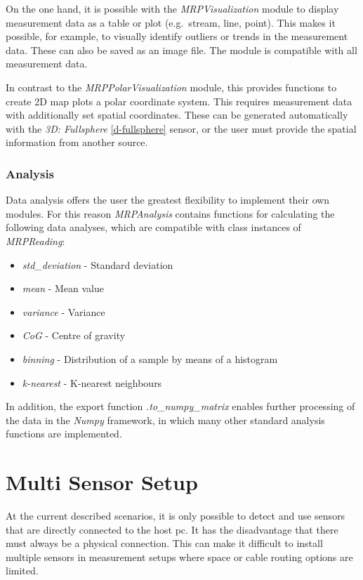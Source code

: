 On the one hand, it is possible with the \emph{MRPVisualization} module
to display measurement data as a table or plot (e.g.~stream, line,
point). This makes it possible, for example, to visually identify
outliers or trends in the measurement data. These can also be saved as
an image file. The module is compatible with all measurement data.

In contrast to the \emph{MRPPolarVisualization} module, this provides
functions to create 2D map plots a polar coordinate system. This
requires measurement data with additionally set spatial coordinates.
These can be generated automatically with the \emph{3D: Fullsphere}
\ref{d-fullsphere} sensor, or the user must provide the spatial
information from another source.

\hypertarget{analysis}{%
\subsubsection{Analysis}\label{analysis}}

Data analysis offers the user the greatest flexibility to implement
their own modules. For this reason \emph{MRPAnalysis} contains functions
for calculating the following data analyses, which are compatible with
class instances of \emph{MRPReading}:

\begin{itemize}
\tightlist
\item
  \emph{std\_deviation} - Standard deviation
\item
  \emph{mean} - Mean value
\item
  \emph{variance} - Variance
\item
  \emph{CoG} - Centre of gravity
\item
  \emph{binning} - Distribution of a sample by means of a histogram
\item
  \emph{k-nearest} - K-nearest neighbours
\end{itemize}

In addition, the export function \emph{.to\_numpy\_matrix} enables
further processing of the data in the \emph{Numpy}
\cite{harris2020array} framework, in which many other standard
analysis functions are implemented.

\hypertarget{multi-sensor-setup}{%
\section{Multi Sensor Setup}\label{multi-sensor-setup}}

At the current described scenarios, it is only possible to detect and
use sensors that are directly connected to the host \gls{pc}. It has the
disadvantage that there must always be a physical connection. This can
make it difficult to install multiple sensors in measurement setups
where space or cable routing options are limited.


